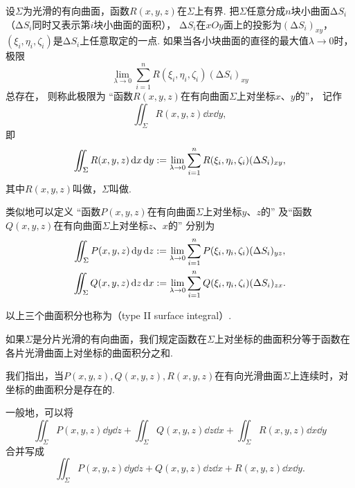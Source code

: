 设\(\Sigma\)为光滑的有向曲面，函数\(R(x,y,z)\)在\(\Sigma\)上有界.
把\(\Sigma\)任意分成\(n\)块小曲面\(\increment S_i\)
（\(\increment S_i\)同时又表示第\(i\)块小曲面的面积），
\(\increment S_i\)在\(xOy\)面上的投影为\((\increment S_i)_{xy}\)，
\((\xi_i,\eta_i,\zeta_i)\)是\(\increment S_i\)上任意取定的一点.
如果当各小块曲面的直径的最大值\(\lambda\to0\)时，极限\begin{equation*}
	\lim_{\lambda\to0}
	\sum_{i=1}^n
	R(\xi_i,\eta_i,\zeta_i)
	(\increment S_i)_{xy}
\end{equation*}总存在，
则称此极限为
“函数\(R(x,y,z)\)在有向曲面\(\Sigma\)上对坐标\(x\)、\(y\)的”，
记作\begin{equation*}
	\iint_\Sigma R(x,y,z) \dd{x}\dd{y},
\end{equation*}
即\begin{equation*}
	\iint_\Sigma R(x,y,z) \dd{x}\dd{y}
	:=
	\lim_{\lambda\to0}
	\sum_{i=1}^n
	R(\xi_i,\eta_i,\zeta_i)
	(\Delta S_i)_{xy},
\end{equation*}
其中\(R(x,y,z)\)叫做，\(\Sigma\)叫做.

类似地可以定义
“函数\(P(x,y,z)\)在有向曲面\(\Sigma\)上对坐标\(y\)、\(z\)的”
及“函数\(Q(x,y,z)\)在有向曲面\(\Sigma\)上对坐标\(z\)、\(x\)的”
分别为\begin{gather*}
	\iint_\Sigma P(x,y,z) \dd{y}\dd{z}
	:=
	\lim_{\lambda\to0}
	\sum_{i=1}^n P(\xi_i,\eta_i,\zeta_i) (\Delta S_i)_{yz}, \\
	\iint_\Sigma Q(x,y,z) \dd{z}\dd{x}
	:=
	\lim_{\lambda\to0}
	\sum_{i=1}^n Q(\xi_i,\eta_i,\zeta_i) (\Delta S_i)_{zx}.
\end{gather*}

以上三个曲面积分也称为（type II surface integral）.

如果\(\Sigma\)是分片光滑的有向曲面，我们规定函数在\(\Sigma\)上对坐标的曲面积分等于函数在各片光滑曲面上对坐标的曲面积分之和.

我们指出，当\(P(x,y,z),Q(x,y,z),R(x,y,z)\)在有向光滑曲面\(\Sigma\)上连续时，对坐标的曲面积分是存在的.

一般地，可以将\begin{equation*}
	\iint_\Sigma P(x,y,z) \dd{y}\dd{z}
	+\iint_\Sigma Q(x,y,z) \dd{z}\dd{x}
	+\iint_\Sigma R(x,y,z) \dd{x}\dd{y}
\end{equation*}合并写成\begin{equation*}
	\iint_\Sigma P(x,y,z)\dd{y}\dd{z}+Q(x,y,z)\dd{z}\dd{x}+R(x,y,z)\dd{x}\dd{y}.
\end{equation*}

